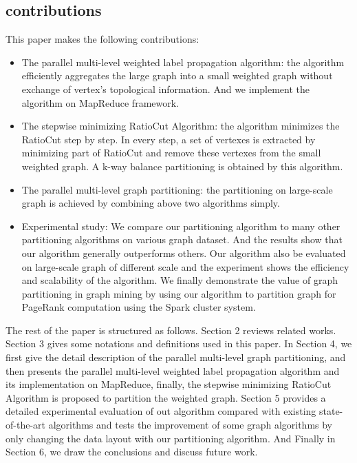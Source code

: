 \documentclass{acm_proc_article-sp}
\begin{document}
\subsection{ contributions}
This paper makes the following contributions:
\begin{itemize}
\item The parallel multi-level weighted label propagation algorithm: the algorithm efficiently aggregates the large graph into a small weighted graph without exchange of vertex's topological information. And we implement the algorithm on MapReduce framework.
\item The stepwise minimizing RatioCut Algorithm: the algorithm minimizes the RatioCut step by step. In every step, a set of vertexes is extracted by minimizing part of RatioCut and remove these vertexes from the small weighted graph. A k-way balance partitioning is obtained by this algorithm.
\item The parallel multi-level graph partitioning: the partitioning on large-scale graph is achieved by combining above two algorithms simply.
\item Experimental study: We compare our partitioning algorithm to many other partitioning algorithms on various graph dataset. And the results show that our algorithm generally outperforms others. Our algorithm also be evaluated on large-scale graph of different scale and the experiment shows the efficiency and scalability of the algorithm. We finally demonstrate the value of graph partitioning in graph mining by using our algorithm to partition graph for PageRank computation using the Spark cluster system.
\end{itemize}
\par
The rest of the paper is structured as follows. Section 2 reviews related works. Section 3 gives some notations and definitions used in this paper. In Section 4, we first give the detail description of the parallel multi-level graph partitioning, and then presents the parallel multi-level weighted label propagation algorithm and its implementation on MapReduce, finally, the stepwise minimizing RatioCut Algorithm is proposed to partition the weighted graph.  Section 5 provides a detailed experimental evaluation of out algorithm compared with existing state-of-the-art algorithms and tests the improvement of some graph algorithms by only changing the data layout with our partitioning algorithm. And Finally in Section 6, we draw the conclusions and discuss future work.
\end{document}

